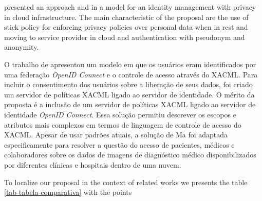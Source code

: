 \documentclass{doublecol-new}
\begin{document}
\cite{werner2015approach} presented an approach and in \cite{werner2016model} a model for an identity management with privacy in cloud infrastructure. The main characteristic of the proposal are the use of stick policy for enforcing privacy policies over personal data when in rest and moving to service provider in cloud and authentication with pseudonym and anonymity.

O trabalho de \cite{ma2015cloud} apresentou um modelo em que os usuários eram identificados por uma federação \textit{OpenID Connect} e o controle de acesso através do XACML. Para incluir o consentimento dos usuários sobre a liberação de seus dados, foi criado um servidor de políticas XACML ligado ao servidor de identidade. O mérito da proposta é a inclusão de um servidor de políticas XACML ligado ao servidor de identidade \textit{OpenID Connect}. Essa solução permitiu descrever os escopos e atributos mais complexos em termos de linguagem de controle de acesso do XACML. Apesar de usar padrões atuais, a solução de Ma foi adaptada especificamente para resolver a questão do acesso de pacientes, médicos e colaboradores sobre os dados de imagens de diagnóstico médico disponibilizados por diferentes clínicas e hospitais dentro de uma nuvem.

To localize our proposal in the context of related works we presents the table \ref{tab-tabela-comparativa} with the points 
\end{document}
